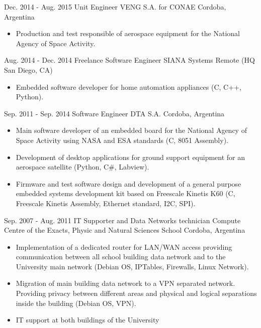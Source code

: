   \cventry
    {Dec. 2014 - Aug. 2015} %
    {Unit Engineer} %
    {VENG S.A. for CONAE} %
    {Cordoba, Argentina} %
    {}
    {
      \begin{itemize} %
        \item {Production and test responsible of aerospace equipment for the National Agency of Space Activity.}
      \end{itemize}
    }

  \cventry
    {Aug. 2014 - Dec. 2014} %
    {Freelance Software Engineer} %
    {SIANA Systems} %
    {Remote (HQ San Diego, CA)} %
    {}
    {
      \begin{itemize} %
        \item {Embedded software developer for home automation appliances (C, C++, Python).}
      \end{itemize}
    }

  \cventry
    {Sep. 2011 - Sep. 2014} %
    {Software Engineer} %
    {DTA S.A.} %
    {Cordoba, Argentina} %
    {}
    {
      \begin{itemize} %
        \item {Main software developer of an embedded board for the National Agency of Space Activity using NASA and ESA standards (C, 8051 Assembly).}
        \item {Development of desktop applications for ground support equipment for an aerospace satellite (Python, C\#, Labview).}
        \item {Firmware and test software design and development of a general purpose embedded systems development kit based on Freescale Kinetis K60 (C, Freescale Kinetis Assembly, Ethernet standard, I2C, SPI).}
      \end{itemize}
    }

  \cventry
    {Sep. 2007 - Aug. 2011} %
    {IT Supporter and Data Networks technician} %
    {Compute Centre of the Exacts, Physic and Natural Sciences School} %
    {Cordoba, Argentina} %
    {}
    {
      \begin{itemize} %
        \item {Implementation of a dedicated router for LAN/WAN access providing communication between all school building data network and to the University main network (Debian OS, IPTables, Firewalls, Linux Network).}
        \item {Migration of main building data network to a VPN separated network. Providing privacy between different areas and physical and logical separations inside the building (Debian OS, VPN)}.
        \item {IT support at both buildings of the University}
      \end{itemize}
    }

